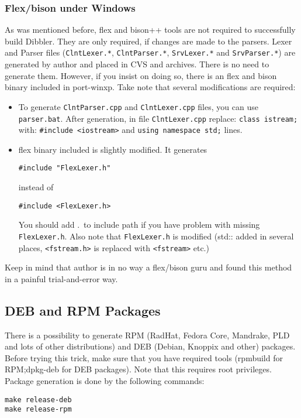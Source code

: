 \subsubsection{Flex/bison under Windows}
As was mentioned before, flex and bison++ tools are not required to
successfully build Dibbler. They are only required, if changes are
made to the parsers. Lexer and Parser files (\verb+ClntLexer.*+, \verb+ClntParser.*+, \verb+SrvLexer.*+ and
\verb+SrvParser.*+) are generated by author and placed in CVS and
archives. There is no need to generate them. However, if you insist on
doing so, there is an flex and bison binary included in port-winxp. Take note that
several modifications are required:

\begin{itemize}
\item To generate \verb+ClntParser.cpp+ and \verb+ClntLexer.cpp+ files, you can use
\verb+parser.bat+. After generation, in file \verb+ClntLexer.cpp+ replace: \verb+class istream;+
with: \verb+#include <iostream>+ and \verb+using namespace std;+ lines.
\item flex binary included is slightly modified. It generates

\begin{verbatim}
#include "FlexLexer.h"
\end{verbatim} 
instead of 
\begin{verbatim}
#include <FlexLexer.h>
\end{verbatim} 

You should
add .\ to include path if you have problem with missing \verb+FlexLexer.h+.
Also note that \verb+FlexLexer.h+ is modified (std:: added in several places,
\verb+<fstream.h>+ is replaced with \verb+<fstream>+ etc.)
\end{itemize}

Keep in mind that author is in no way a flex/bison guru and found this method
in a painful trial-and-error way. 

\subsection{DEB and RPM Packages}
There is a possibility to generate RPM (RadHat, Fedora Core, Mandrake,
PLD and lots of other distributions) and DEB (Debian, Knoppix and
other) packages. Before trying this trick, make sure that you have
required tools (rpmbuild for RPM;dpkg-deb for DEB
packages). Note that this requires root privileges. 
Package generation is done by the following commands:

\begin{verbatim}
make release-deb
make release-rpm
\end{verbatim}